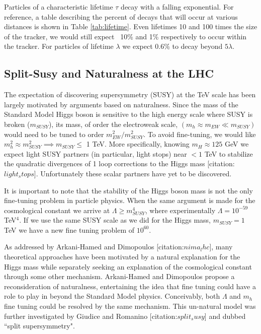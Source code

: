 

Particles of a characteristic lifetime $\tau$ decay with a falling exponential. For reference, 
a table describing the percent of decays that will occur at various distances is shown in Table
 \ref{tab:lifetime}. Even lifetimes 10 and 100 times the size of the tracker, we would still expect
~10\% and 1\% respectively to occur within the tracker. For particles  of lifetime $\lambda$ we
expect 0.6\% to decay beyond $5\lambda$. 



\subsection{Split-Susy and Naturalness at the LHC}

The expectation of discovering supersymmetry (SUSY) at the TeV scale has been largely motivated
 by arguments based on naturalness. 
Since the mass of the Standard Model Higgs boson is sensitive to the high energy scale where SUSY
 is broken ($m_{SUSY}$), its mass, of order the electroweak scale, $(m_h \approx m_{EW} \ll m_{SUSY})$
 would need to be tuned to order $m_{EW}^2/m_{SUSY}^2$. 
To avoid fine-tuning, we would like  $m_h^2 \approx m_{SUSY}^2 \implies m_{SUSY} \leq$ 1 TeV. 
More specifically, knowing $m_H \approx 125$ GeV we expect light SUSY partners (in particular, light stops)
 near $< 1$ TeV to stabilize the quadratic divergences of 1 loop corrections to the Higgs mass
 [citation:$light_stops$]. 
Unfortunately these scalar partners have yet to be discovered.

It is important to note that the stability of the Higgs boson mass is not the only
 fine-tuning problem in particle physics. 
When the same argument is made for the cosmological constant we arrive at $\Lambda \geq m_{SUSY}^4$, 
where experimentally $\Lambda = 10^{-59}$ TeV$^4$.   
If we use the same SUSY scale as we did for the Higgs mass,
 $m_{SUSY} = 1$ TeV we have a new fine tuning problem of $10^{60}$.

As addressed by Arkani-Hamed and Dimopoulos [citation:$nima_lhc$], many theoretical approaches  have been
 motivated by a natural explanation for the Higgs mass while separately seeking an  explanation
 of the cosmological constant through some other mechanism.
Arkani-Hamed and Dimopoulos propose a reconsideration of naturalness, entertaining the idea that 
fine tuning could have a role to play in beyond the Standard Model physics.
Conceivably, both $\Lambda$ and $m_h$ fine tuning could be resolved by the same mechanism.  
This un-natural model was  further investigated by Giudice and Romanino [citation:$split_susy$]
and dubbed ``split supersymmetry". 

